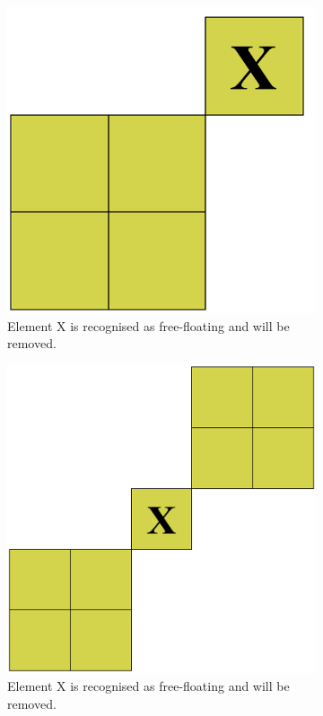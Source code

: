 \begin{figure}[H]
  \centering
  \medskip
  \begin{subfigure}[t]{.3\linewidth}
    \centering\includegraphics[width=.8\linewidth]{free1.png}
    \caption{Element X is recognised as free-floating and will be removed.}
  \end{subfigure}
  \begin{subfigure}[t]{.3\linewidth}
    \centering\includegraphics[width=.8\linewidth]{free2.png}
    \caption{Element X is recognised as free-floating and will be removed.}
  \end{subfigure}
  \begin{subfigure}[t]{.3\linewidth}

\end{subfigure}
\end{figure}
